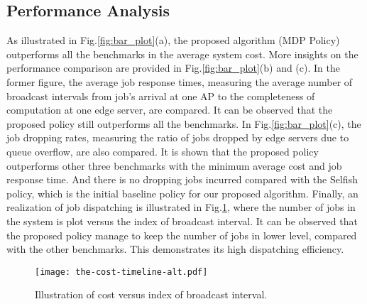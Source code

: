\subsection{Performance Analysis}
\label{subsec:basic}
As illustrated in Fig.\ref{fig:bar_plot}(a), the proposed algorithm (MDP Policy) outperforms all the benchmarks in the average system cost.
More insights on the performance comparison are provided in Fig.\ref{fig:bar_plot}(b) and (c).
In the former figure, the average job response times, measuring the average number of broadcast intervals from job's arrival at one AP to the completeness of computation at one edge server, are compared.
It can be observed that the proposed policy still outperforms all the benchmarks.
In Fig.\ref{fig:bar_plot}(c), the job dropping rates, measuring the ratio of jobs dropped by edge servers due to queue overflow, are also compared.
It is shown that the proposed policy outperforms other three benchmarks with the minimum average cost and job response time.
{And there is no dropping jobs incurred compared with the Selfish policy, which is the initial baseline policy for our proposed algorithm.}
Finally, an realization of job dispatching is illustrated in Fig.\ref{fig:general_timeline}, where the number of jobs in the system is plot versus the index of broadcast interval.
It can be observed that the proposed policy manage to keep the number of jobs in lower level, compared with the other benchmarks.
This demonstrates its high dispatching efficiency.
%

\begin{figure}[ht!]                                                                             %
    \centering                                                                                  %
    \texttt{[image: the-cost-timeline-alt.pdf]}                     %
    \caption{Illustration of cost versus index of broadcast interval.}
    \label{fig:general_timeline}                                                                %
\end{figure}                                                                                    %

